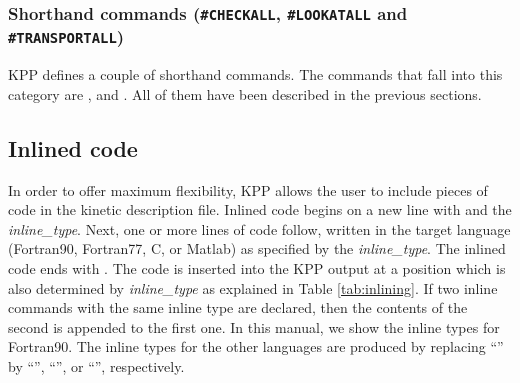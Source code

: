 \documentclass[twoside]{article}
\begin{document}
\subsubsection{Shorthand commands ({\tt\#CHECKALL}, {\tt\#LOOKATALL} and
  {\tt\#TRANSPORTALL})}
\label{sec:command-shorthand}

KPP defines a couple of shorthand commands. The commands that fall into
this category are ,  and
. All of them have been described in the previous
sections.

\subsection{Inlined code}

In order to offer maximum flexibility, KPP allows the user to include
pieces of code in the kinetic description file. Inlined code begins on a
new line with  and the {\it inline\_type}. Next, one or
more lines of code follow, written in the target language (Fortran90,
Fortran77, C, or Matlab) as specified by the {\it inline\_type}. The
inlined code ends with . The code is inserted into the
KPP output at a position which is also determined by {\it inline\_type}
as explained in Table \ref{tab:inlining}. If two inline commands with
the same inline type are declared, then the contents of the second is
appended to the first one. In this manual, we show the inline types for
Fortran90. The inline types for the other languages are produced by
replacing ``'' by ``'', ``'', or
``'', respectively.
\end{document}
